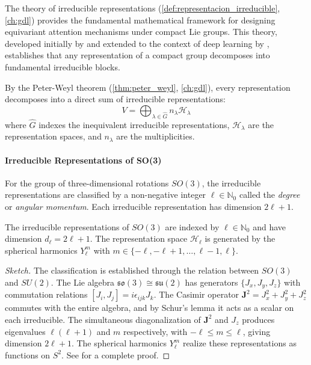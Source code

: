 The theory of irreducible representations (\autoref{def:representacion_irreducible}, \autoref{ch:gdl}) provides the fundamental mathematical framework for designing equivariant attention mechanisms under compact Lie groups. This theory, developed initially by \citet{Peter1927} and extended to the context of deep learning by \citet{kondor2018generalizationconvolutionalneural}, establishes that any representation of a compact group decomposes into fundamental irreducible blocks.

By the Peter-Weyl theorem (\autoref{thm:peter_weyl}, \autoref{ch:gdl}), every representation decomposes into a direct sum of irreducible representations:
\begin{equation}
V = \bigoplus_{\lambda \in \widehat{G}} n_\lambda \mathcal{H}_\lambda
\label{eq:peter_weyl_decomposition_attention}
\end{equation}
where $\widehat{G}$ indexes the inequivalent irreducible representations, $\mathcal{H}_\lambda$ are the representation spaces, and $n_\lambda$ are the multiplicities.

\paragraph{Irreducible Representations of SO(3)}

For the group of three-dimensional rotations $SO(3)$, the irreducible representations are classified by a non-negative integer $\ell \in \mathbb{N}_0$ called the \textit{degree} or \textit{angular momentum}. Each irreducible representation has dimension $2\ell + 1$.

\begin{theorem}\label{thm:so3_irreps}
The irreducible representations of $SO(3)$ are indexed by $\ell \in \mathbb{N}_0$ and have dimension $d_\ell = 2\ell + 1$. The representation space $\mathcal{H}_\ell$ is generated by the spherical harmonics $Y_\ell^m$ with $m \in \{-\ell, -\ell+1, \ldots, \ell-1, \ell\}$.
\end{theorem}

\begin{proof}[Sketch]
The classification is established through the relation between $SO(3)$ and $SU(2)$. The Lie algebra $\mathfrak{so}(3) \cong \mathfrak{su}(2)$ has generators $\{J_x, J_y, J_z\}$ with commutation relations $[J_i, J_j] = i\epsilon_{ijk}J_k$. The Casimir operator $\mathbf{J}^2 = J_x^2 + J_y^2 + J_z^2$ commutes with the entire algebra, and by Schur's lemma it acts as a scalar on each irreducible. The simultaneous diagonalization of $\mathbf{J}^2$ and $J_z$ produces eigenvalues $\ell(\ell+1)$ and $m$ respectively, with $-\ell \leq m \leq \ell$, giving dimension $2\ell+1$. The spherical harmonics $Y_\ell^m$ realize these representations as functions on $S^2$. See \citep{brocker1985representations} for a complete proof.
\end{proof}

